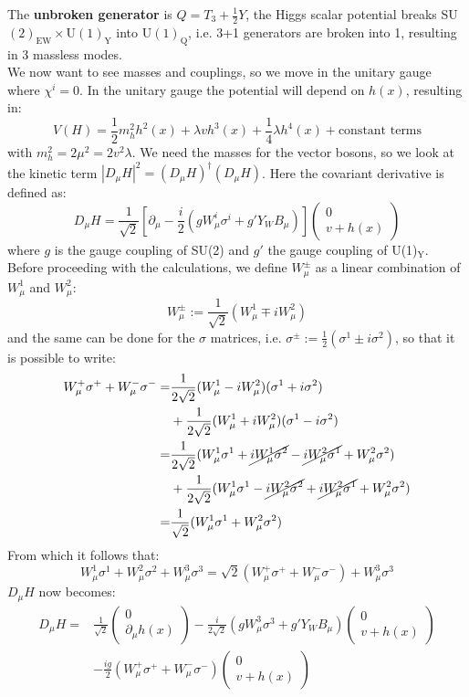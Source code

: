 \documentclass[../main.tex]{subfiles}
\begin{document}
The \textbf{unbroken generator} is $Q=T_3+\frac{1}{2}Y$, the Higgs scalar potential breaks SU$(2)_{\text{EW}}\times$U$(1)_{\text{Y}}$ into U$(1)_{\text{Q}}$, i.e. 3+1 generators are broken into 1, resulting in 3 massless modes.\\
We now want to see masses and couplings, so we move in the unitary gauge where $\chi^i=0$. In the unitary gauge the potential will depend on $h(x)$, resulting in:
\[
V(H)=\frac{1}{2}m_h^2h^2(x)+\lambda vh^3(x)+\frac{1}{4}\lambda h^4(x)+\text{constant terms}
\]
with $m_h^2=2\mu^2=2v^2\lambda$. We need the masses for the vector bosons, so we look at the kinetic term
$|D_\mu H|^2=(D_\mu H)^\dagger(D_\mu H)$. Here the covariant derivative is defined as:
\[
D_\mu H=\frac{1}{\sqrt{2}}\left[\partial_\mu-\frac{i}{2}(gW_\mu^i\sigma^i+g'Y_WB_\mu)\right]\begin{pmatrix}0 \\ v+h(x)\end{pmatrix}
\]
where $g$ is the gauge coupling of SU(2) and $g'$ the gauge coupling of U(1)$_{\text{Y}}$.\\
Before proceeding with the calculations, we define $W_\mu^\pm$ as a linear combination of $W_\mu^1$ and $W_\mu^2$: 
\[
W_\mu^\pm:=\frac{1}{\sqrt{2}}(W_\mu^1\mp iW_\mu^2)
\]
and the same can be done for the $\sigma$ matrices, i.e. $\sigma^\pm:=\frac{1}{2}(\sigma^1\pm i\sigma^2)$, so that it is possible to write:
\begin{align*}
W_\mu^+\sigma^++W_\mu^-\sigma^-=&\frac{1}{2\sqrt{2}}(W_\mu^1-iW_\mu^2)(\sigma^1+i\sigma^2)\\
&+\frac{1}{2\sqrt{2}}(W_\mu^1+iW_\mu^2)(\sigma^1-i\sigma^2)\\
=&\frac{1}{2\sqrt{2}}(W_\mu^1\sigma^1+\cancel{iW_\mu^1\sigma^2}-\cancel{iW_\mu^2\sigma^1}+W_\mu^2\sigma^2)\\
&+\frac{1}{2\sqrt{2}}(W_\mu^1\sigma^1-\cancel{iW_\mu^2\sigma^2}+\cancel{iW_\mu^2\sigma^1}+W_\mu^2\sigma^2)\\
=&\frac{1}{\sqrt{2}}(W_\mu^1\sigma^1+W_\mu^2\sigma^2)
\end{align*}
From which it follows that:
\[
W_\mu^1\sigma^1+W_\mu^2\sigma^2+W_\mu^3\sigma^3=\sqrt{2}(W_\mu^+\sigma^++W_\mu^-\sigma^-)+W_\mu^3\sigma^3
\]
$D_\mu H$ now becomes:
\begin{align*}
D_\mu H=&\frac{1}{\sqrt{2}}\begin{pmatrix}0 \\ \partial_\mu h(x)\end{pmatrix}-\frac{i}{2\sqrt{2}}(gW_\mu^3\sigma^3+g'Y_WB_\mu)\begin{pmatrix}0 \\ v+h(x)\end{pmatrix}\\
&-\frac{ig}{2}(W_\mu^+\sigma^++W_\mu^-\sigma^-)\begin{pmatrix}0 \\ v+h(x)\end{pmatrix}
\end{align*}
\end{document}
